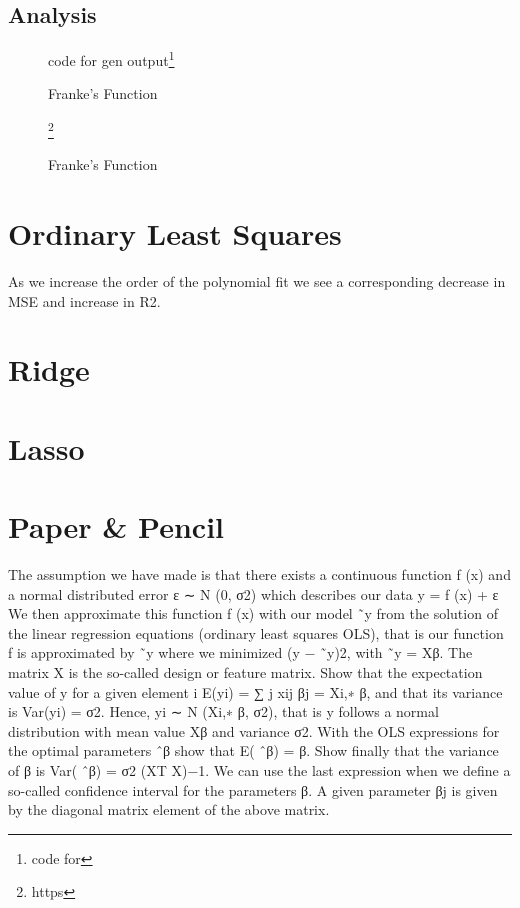 \documentclass[twoside,11pt]{report}
\begin{document}
\subsection{Analysis}
\begin{figure}[!h]
    \begin{center}
    \resizebox*{0.9\linewidth}{!}{}
    \caption{Franke's Function}
    \label{ols}
    {\scriptsize code for gen  output}\footnote{code for }
    \end{center}
\end{figure}
\begin{figure}[!h]
    \begin{center}
    \resizebox*{0.7\linewidth}{!}{}
    \caption{Franke's Function}
    \label{}
    \footnote{https}
    \end{center}
\end{figure}

\section{Ordinary Least Squares}
As we increase the order of the polynomial fit we see a corresponding decrease in MSE and increase in R2.
\section{Ridge}
\section{Lasso}
\section{Paper \& Pencil}
The assumption we have made is that there exists a continuous function f (x)
and a normal distributed error ε ∼ N (0, σ2) which describes our data
y = f (x) + ε
We then approximate this function f (x) with our model ˜y from the solution
of the linear regression equations (ordinary least squares OLS), that is our
function f is approximated by ˜y where we minimized (y − ˜y)2, with
˜y = Xβ.
The matrix X is the so-called design or feature matrix.
Show that the expectation value of y for a given element i
E(yi) = ∑
j
xij βj = Xi,∗ β,
and that its variance is
Var(yi) = σ2.
Hence, yi ∼ N (Xi,∗ β, σ2), that is y follows a normal distribution with mean
value Xβ and variance σ2.
With the OLS expressions for the optimal parameters ˆβ show that
E( ˆβ) = β.
Show finally that the variance of β is
Var( ˆβ) = σ2 (XT X)−1.
We can use the last expression when we define a so-called confidence interval
for the parameters β. A given parameter βj is given by the diagonal matrix
element of the above matrix.
\end{document}
